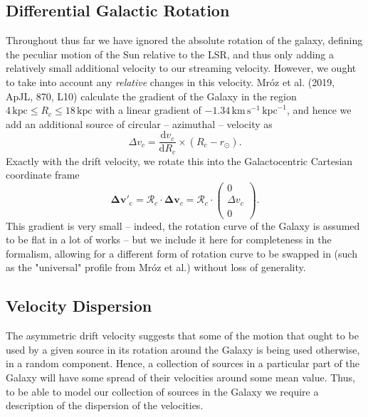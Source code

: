 \documentclass[fleqn,usenatbib]{mnras}
\begin{document}
\subsection{Differential Galactic Rotation}
Throughout thus far we have ignored the absolute rotation of the galaxy, defining the peculiar motion of the Sun relative to the LSR, and thus only adding a relatively small additional velocity to our streaming velocity. However, we ought to take into account any \textit{relative} changes in this velocity. Mr\'{o}z et al. (2019, ApJL, 870, L10) calculate the gradient of the Galaxy in the region $4\,\mathrm{kpc} \leq R_c \leq 18\,\mathrm{kpc}$ with a linear gradient of $-1.34\,\mathrm{km}\,\mathrm{s}^{-1}\,\mathrm{kpc}^{-1}$, and hence we add an additional source of circular -- azimuthal -- velocity as
\begin{equation}
    \Delta v_c = \frac{\mathrm{d}v_c}{\mathrm{d}R_c} \times (R_c - r_\odot).
\end{equation}
Exactly with the drift velocity, we rotate this into the Galactocentric Cartesian coordinate frame
\begin{equation}
    \bm{\Delta v}{'}_\mathrm{\!\!c} = \bm{\mathcal{R}}_c \cdot \bm{\Delta v}_c = \bm{\mathcal{R}}_c \cdot \left(\begin{matrix} 0 \\ \Delta v_c \\ 0 \end{matrix}\right).
\end{equation}
This gradient is very small -- indeed, the rotation curve of the Galaxy is assumed to be flat in a lot of works -- but we include it here for completeness in the formalism, allowing for a different form of rotation curve to be swapped in (such as the "universal" profile from Mr\'{o}z et al.) without loss of generality.

\subsection{Velocity Dispersion}
The asymmetric drift velocity suggests that some of the motion that ought to be used by a given source in its rotation around the Galaxy is being used otherwise, in a random component. Hence, a collection of sources in a particular part of the Galaxy will have some spread of their velocities around some mean value. Thus, to be able to model our collection of sources in the Galaxy we require a description of the dispersion of the velocities.
\end{document}
